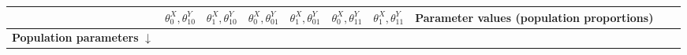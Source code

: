 \documentclass[
  12pt,
]{book}
\begin{document}
\begin{longtable}[]{@{}cccccccccc@{}}
\begin{minipage}[b]{0.07\columnwidth}
\end{minipage} & \begin{minipage}[b]{0.07\columnwidth}\centering
\(\theta^X_0,\theta^Y_{10}\)\strut
\end{minipage} & \begin{minipage}[b]{0.07\columnwidth}\centering
\(\theta^X_1,\theta^Y_{10}\)\strut
\end{minipage} & \begin{minipage}[b]{0.07\columnwidth}\centering
\(\theta^X_0,\theta^Y_{01}\)\strut
\end{minipage} & \begin{minipage}[b]{0.07\columnwidth}\centering
\(\theta^X_1,\theta^Y_{01}\)\strut
\end{minipage} & \begin{minipage}[b]{0.07\columnwidth}\centering
\(\theta^X_0,\theta^Y_{11}\)\strut
\end{minipage} & \begin{minipage}[b]{0.07\columnwidth}\centering
\(\theta^X_1,\theta^Y_{11}\)\strut
\end{minipage} & \begin{minipage}[b]{0.10\columnwidth}\centering
Parameter values (population proportions)\strut
\end{minipage}\tabularnewline
\midrule
\endhead
\begin{minipage}[t]{0.10\columnwidth}\centering
\textbf{Population parameters} \(\downarrow\)\strut
\end{minipage} & \begin{minipage}[t]{0.07\columnwidth}\centering
\strut
\end{minipage} & \begin{minipage}[t]{0.07\columnwidth}\centering
\strut
\end{minipage} & \begin{minipage}[t]{0.07\columnwidth}\centering
\strut
\end{minipage} & \begin{minipage}[t]{0.07\columnwidth}\centering
\strut
\end{minipage} & \begin{minipage}[t]{0.07\columnwidth}\centering
\strut
\end{minipage} & \begin{minipage}[t]{0.07\columnwidth}\centering
\strut
\end{minipage} & \begin{minipage}[t]{0.07\columnwidth}\centering
\strut
\end{minipage} & \begin{minipage}[t]{0.07\columnwidth}\centering

\end{minipage}
\end{longtable}
\end{document}
